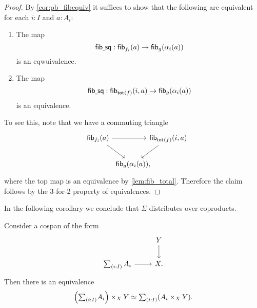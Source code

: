 \begin{proof}
By \cref{cor:pb_fibequiv} it suffices to show that the following are equivalent for each $i:I$ and $a:A_i$:
\begin{enumerate}
\item The map
\begin{equation*}
\mathsf{fib\underline{\ }{}sq} : \mathsf{fib}_{f_i}(a) \to \mathsf{fib}_{g}(\alpha_i(a))
\end{equation*}
is an eqwuivalence.
\item The map
\begin{equation*}
\mathsf{fib\underline{\ }{}sq} : \mathsf{fib}_{\mathsf{tot}_{}(f)}(i,a)\to \mathsf{fib}_{g}(\alpha_i(a))
\end{equation*}
is an equivalence.
\end{enumerate}
To see this, note that we have a commuting triangle
\begin{equation*}
\begin{tikzcd}[column sep=-1em]
\fib{f_i}{a} \arrow[rr] \arrow[dr] & & \fib{\total{f}}{i,a} \arrow[dl] \\
\phantom{\fib{\total{f}}{i,a}} & \fib{g}{\alpha_i(a)},
\end{tikzcd}
\end{equation*}
where the top map is an equivalence by \cref{lem:fib_total}. Therefore the claim follows by the 3-for-2 property of equivalences.
\end{proof}

In the following corollary we conclude that $\Sigma$ distributes over coproducts.

\begin{cor}
Consider a cospan of the form
\begin{equation*}
\begin{tikzcd}
& Y \arrow[d] \\
\sm{i:I}A_i \arrow[r] & X.
\end{tikzcd}
\end{equation*}
Then there is an equivalence
\begin{equation*}
\Big(\sm{i:I}A_i\Big)\times_X Y \simeq \sm{i:I} (A_i\times_X Y).
\end{equation*}
\end{cor}



